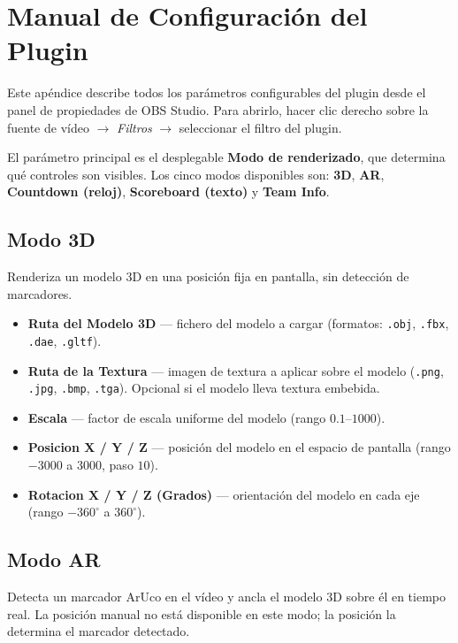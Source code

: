 \chapter{Manual de Configuración del Plugin}
\label{Appendix:Configuracion}

Este apéndice describe todos los parámetros configurables del plugin desde el panel de propiedades de OBS Studio. Para abrirlo, hacer clic derecho sobre la fuente de vídeo $\rightarrow$ \textit{Filtros} $\rightarrow$ seleccionar el filtro del plugin.

El parámetro principal es el desplegable \textbf{Modo de renderizado}, que determina qué controles son visibles. Los cinco modos disponibles son: \textbf{3D}, \textbf{AR}, \textbf{Countdown (reloj)}, \textbf{Scoreboard (texto)} y \textbf{Team Info}.

\section*{Modo 3D}

Renderiza un modelo 3D en una posición fija en pantalla, sin detección de marcadores.

\begin{itemize}
  \item \textbf{Ruta del Modelo 3D} — fichero del modelo a cargar (formatos: \texttt{.obj}, \texttt{.fbx}, \texttt{.dae}, \texttt{.gltf}).
  \item \textbf{Ruta de la Textura} — imagen de textura a aplicar sobre el modelo (\texttt{.png}, \texttt{.jpg}, \texttt{.bmp}, \texttt{.tga}). Opcional si el modelo lleva textura embebida.
  \item \textbf{Escala} — factor de escala uniforme del modelo (rango $0.1$--$1000$).
  \item \textbf{Posicion X / Y / Z} — posición del modelo en el espacio de pantalla (rango $-3000$ a $3000$, paso $10$).
  \item \textbf{Rotacion X / Y / Z (Grados)} — orientación del modelo en cada eje (rango $-360^\circ$ a $360^\circ$).
\end{itemize}

\section*{Modo AR}

Detecta un marcador ArUco en el vídeo y ancla el modelo 3D sobre él en tiempo real. La posición manual no está disponible en este modo; la posición la determina el marcador detectado.


